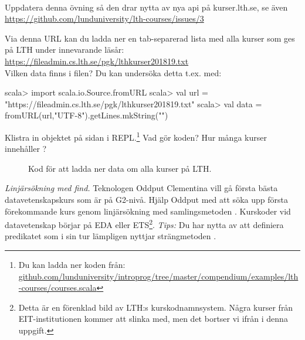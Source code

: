 \QUESTEND





\QUESTBEGIN

\Task \label{task:linsearch-lth}\what~

\TODO Uppdatera denna övning så den drar nytta av nya api på kurser.lth.se, se även \url{https://github.com/lunduniversity/lth-courses/issues/3}

\Subtask Via denna URL kan du ladda ner en tab-separerad lista med alla kurser som ges på LTH under innevarande läsår: \url{https://fileadmin.cs.lth.se/pgk/lthkurser201819.txt} \\Vilken data finns i filen? Du kan undersöka detta t.ex. med:
\begin{REPLnonum}
scala> import scala.io.Source.fromURL
scala> val url = "https://fileadmin.cs.lth.se/pgk/lthkurser201819.txt"
scala> val data = fromURL(url,"UTF-8").getLines.mkString("\n")
\end{REPLnonum}

\Subtask \label{subtask:download-lthcourses} Klistra in objektet  på sidan \pageref{lth-courses} i REPL.\footnote{Du kan ladda ner koden från: \\ \href{https://raw.githubusercontent.com/lunduniversity/introprog/master/compendium/examples/lth-courses/courses.scala}{github.com/lunduniversity/introprog/tree/master/compendium/examples/lth-courses/courses.scala}} Vad gör koden? Hur många kurser innehåller ?

\begin{figure}[h]
  \caption{Kod för att ladda ner data om alla kurser på LTH.}
  \label{lth-courses}
\end{figure}


\Subtask \emph{Linjärsökning med find.} Teknologen Oddput Clementina vill gå första bästa datavetenskapskurs som är på G2-nivå. Hjälp Oddput med att söka upp första förekommande kurs genom linjärsökning med samlingsmetoden . Kurskoder vid datavetenskap börjar på EDA eller ETS\footnote{Detta är en förenklad bild av LTH:s kurskodnamnsystem. Några kurser från EIT-institutionen  kommer att slinka med, men det bortser vi ifrån i denna uppgift.}. \emph{Tips:} Du har nytta av att definiera predikatet  som i sin tur lämpligen nyttjar strängmetoden .

